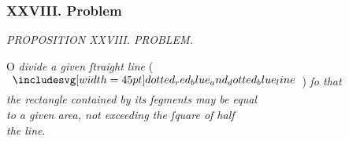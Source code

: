 \documentclass[12pt,preview]{standalone}
\begin{document}
\subsubsection{XXVIII. Problem}

\begin{minipage}[t]{0.64\textwidth}
    \vspace{0pt}

    \begin{center}
        \textit{PROPOSITION XXVIII. PROBLEM.}\label{book6pr28} \\
    \end{center}

    \hfill

    \begin{center}
        \raggedright \lettrine[lines=4, loversize=1, nindent=0pt]{}{}O \textit{divide a given ſtraight line} (\hspace{-1ex}$\bimg{dotted_red_blue_and_dotted_blue_line}$\hspace{-1ex}) \textit{ſo that\\ the rectangle contained by its ſegments may be equal\\ to a given area, not exceeding the ſquare of half\\ the line}.
    \end{center}

    \hfill

    \hfill


\end{minipage}
\end{document}
